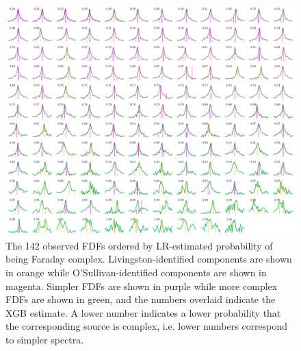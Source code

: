   \begin{figure}
    \centering
    \includegraphics[width=\linewidth]{faraday-images/both_spectra_lr.pdf}
    \caption{The 142 observed FDFs ordered by LR-estimated probability of being Faraday complex. Livingston-identified components are shown in orange while O'Sullivan-identified components are shown in magenta. Simpler FDFs are shown in purple while more complex FDFs are shown in green, and the numbers overlaid indicate the XGB estimate. A lower number indicates a lower probability that the corresponding source is complex, i.e. lower numbers correspond to simpler spectra.}
    \label{fig:all-observed-fdfs-lr}
  \end{figure}

